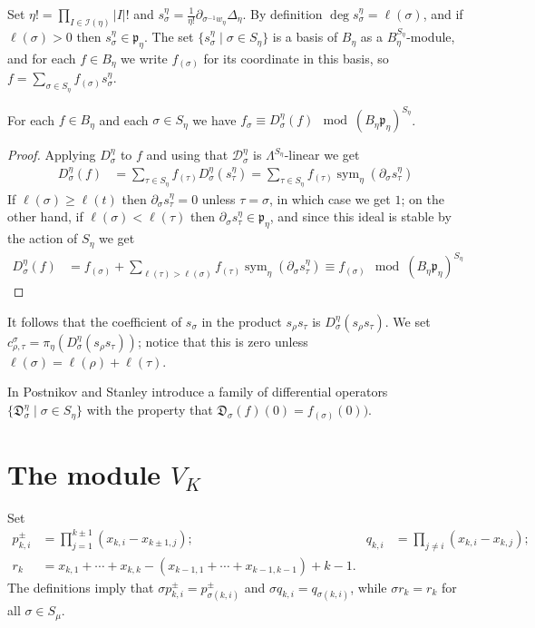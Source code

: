 \documentclass[11pt,fleqn]{article}
\newcommand\D{\mathcal D}
\newcommand\DD{\mathfrak D}
\newcommand\I{\mathcal I}
\newcommand\p{\mathfrak p}
\DeclareMathOperator\sym{sym}
\begin{document}
Set $\eta! = \prod_{I \in \I(\eta)} |I|!$ and $s^\eta_\sigma = \frac{1}{\eta!}
\partial_{\sigma^{-1} w_\eta} \Delta_\eta$. By definition $\deg s^\eta_\sigma
= \ell(\sigma)$, and if $\ell(\sigma) > 0$ then $s_\sigma^\eta \in \p_\eta$.
The set $\{s^\eta_\sigma \mid \sigma \in S_\eta\}$ is a basis of $B_\eta$ as a 
$B_\eta^{S_\eta}$-module, and for each $f \in B_\eta$ we write $f_{(\sigma)}$
for its coordinate in this basis, so $f = \sum_{\sigma \in S_\eta} f_{(\sigma)}
s_\sigma^\eta$.

\begin{Lemma*}
For each $f \in B_\eta$ and each $\sigma \in S_\eta$ we have $f_{\sigma}
\equiv D_{\sigma}^\eta(f) \mod (B_\eta\p_\eta)^{S_\eta}$.
\end{Lemma*}
\begin{proof}
Applying $D^\eta_\sigma$ to $f$ and using that $\D_\sigma^\eta$ is 
$\Lambda^{S_\eta}$-linear we get
\begin{align*}
D^\eta_\sigma(f) 
	&= \sum_{\tau \in S_\eta} f_{(\tau)} D^\eta_\sigma(s_\tau^\eta)
	= \sum_{\tau \in S_\eta} 
		f_{(\tau)} \sym_\eta (\partial_\sigma s_{\tau}^\eta)
\end{align*}
If $\ell(\sigma) \geq \ell(t)$ then $\partial_\sigma s_\tau^\eta = 0$ unless
$\tau = \sigma$, in which case we get $1$; on the other hand, if 
$\ell(\sigma) < \ell(\tau)$ then $\partial_\sigma s_\tau^\eta \in \p_\eta$,
and since this ideal is stable by the action of $S_\eta$ we get
\begin{align*}
D_\sigma^\eta(f) 
	&= f_{(\sigma)} + \sum_{\ell(\tau) > \ell(\sigma)} 
		f_{(\tau)} \sym_\eta (\partial_\sigma s^\eta_\tau) 
		\equiv f_{(\sigma)} \mod (B_\eta\p_\eta)^{S_\eta}
\end{align*}
\end{proof}
It follows that the coefficient of $s_\sigma$ in the product $s_\rho s_\tau$
is $D_\sigma^\eta(s_\rho s_\tau)$. We set $c^\sigma_{\rho, \tau} = 
\pi_\eta(D_\sigma^\eta(s_\rho s_\tau))$; notice that this is zero unless
$\ell(\sigma) = \ell(\rho) + \ell(\tau)$.

In \cite{PS-chains-bruhat} Postnikov and Stanley introduce a family of
differential operators $\{\DD_\sigma^\eta \mid \sigma \in S_\eta\}$ with the
property that $\DD_\sigma(f)(0) = f_{(\sigma)}(0))$.

\section{The module $V_K$}
Set 
\begin{align*}
p_{k,i}^\pm 
	&= \prod_{j = 1}^{k \pm 1} (x_{k,i} - x_{k \pm 1, j}); 
&q_{k,i} 
	&= \prod_{j \neq i} (x_{k,i} - x_{k,j}); \\
r_{k} 
	&= x_{k,1} + \cdots + x_{k,k} - (x_{k-1,1} + \cdots + x_{k-1,k-1}) + k -1.
\end{align*}
The definitions imply that $\sigma p_{k,i}^\pm = p_{\sigma(k,i)}^\pm$ and 
$\sigma q_{k,i} = q_{\sigma(k,i)}$, while $\sigma r_k = r_k$ for all $\sigma 
\in S_\mu$.
\end{document}
